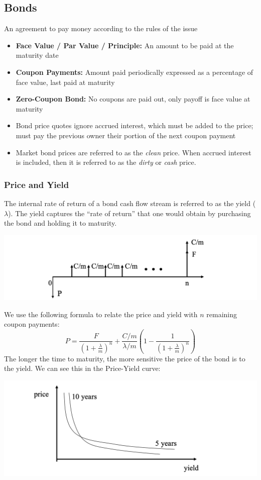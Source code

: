 \documentclass[11pt]{article}
\begin{document}
\subsection{Bonds}
An agreement to pay money according to the rules of the issue
\begin{itemize}
\item \textbf{Face Value / Par Value / Principle:} An amount to be paid at the maturity date 
\item \textbf{Coupon Payments:} Amount paid periodically expressed as a percentage of face value, last paid at maturity 
\item \textbf{Zero-Coupon Bond:} No coupons are paid out, only payoff is face value at maturity
\item Bond price quotes ignore accrued interest, which must be added to the price; must pay the previous owner their portion of the next coupon payment
\item Market bond prices are referred to as the \textit{clean} price. When accrued interest is included, then it is referred to as the \textit{dirty} or \textit{cash} price.
\end{itemize}

\subsubsection{Price and Yield}
The internal rate of return of a bond cash flow stream is referred to as the yield ($\lambda$). The yield captures the “rate of return” that one would obtain by purchasing the bond and holding it to maturity. 
\begin{center}
\includegraphics[scale=0.6]{images/yield.png} 
\end{center}
We use the following formula to relate the price and yield with $n$ remaining coupon payments:
$$ P = \frac{F}{\left(1+\frac{\lambda}{m}\right)^n} + \frac{C/m}{\lambda / m } \left(1 - \frac{1}{\left(1+\frac{\lambda}{m}\right)^n}\right) $$
The longer the time to maturity, the more sensitive the price of the bond is to the yield.  We can see this in the Price-Yield curve:
\begin{center}
\includegraphics[scale=0.7]{images/py.png} 
\end{center}
\end{document}
